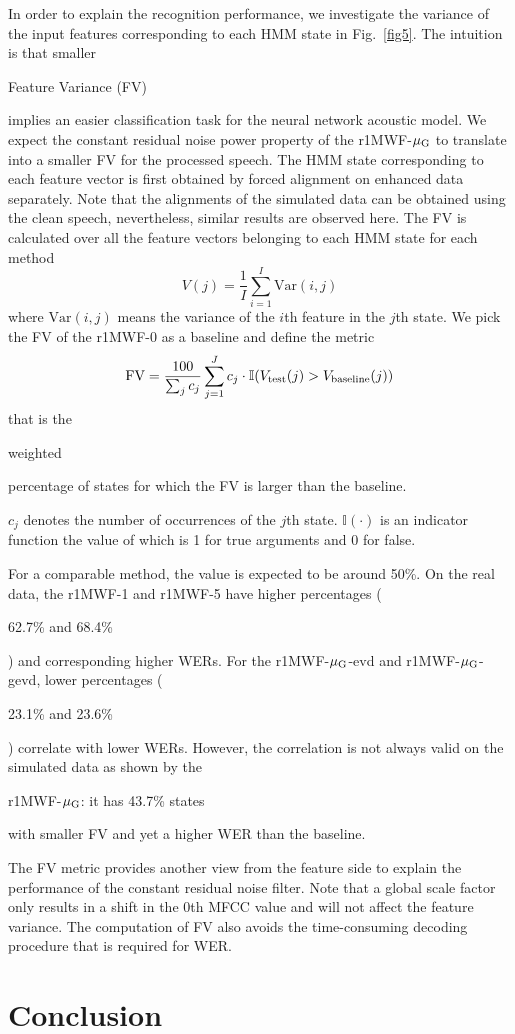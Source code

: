 \documentclass[review]{elsarticle}
\newif\ifproofread
\newcommand{\pfmarker}[1]{%
\ifproofread
\textcolor{red}{#1}%
\else
#1%
\fi
}
\newif\ifminorR
\newcommand{\pfminor}[1]{%
\ifminorR
\textcolor{red}{#1}%
\else
#1%
\fi
}
\begin{document}
In order to explain the recognition performance, we investigate the variance of the input features corresponding to each HMM state in Fig.~\ref{fig5}. The intuition is that smaller \pfminor{Feature Variance (FV)} implies an easier classification task for the neural network acoustic model. We expect the constant residual noise power property of the r1MWF-$\mu_{\text G}$ to translate into a smaller FV for the processed speech. The HMM state corresponding to each feature vector is first obtained by forced alignment on enhanced data separately. Note that the alignments of the simulated data can be obtained using the clean speech, nevertheless, similar results are observed here. The FV is calculated over all the feature vectors belonging to each HMM state for each method
\begin{equation}\label{eq:fv}
  V(j)=\frac{1}{I}\sum_{i=1}^{I}\text{Var}(i,j)
\end{equation}
where $\text{Var}(i,j)$ means the variance of the $i$th feature in the $j$th state. We pick the FV of the r1MWF-0 as a baseline and define the metric
\begin{equation}\label{eq:featvar}
  \text{FV}=\frac{100}{\sum_{j}c_j}\sum_{j=1}^{J}{\pfmarker{c_j\cdot\mathbb{I}}(V_{\text{test}}(j)>V_{\text{baseline}}(j))}
\end{equation}
that is the \pfmarker{weighted} percentage of states for which the FV is larger than the baseline. \pfmarker{$c_j$ denotes the number of occurrences of the $j$th state. $\mathbb{I}(\cdot)$ is an indicator function the value of which is 1 for true arguments and 0 for false.} For a comparable method, the value is expected to be around 50\%. On the real data, the r1MWF-1 and r1MWF-5 have higher percentages (\pfmarker{62.7\% and 68.4\%}) and corresponding higher WERs. For the r1MWF-$\mu_{\text G}$-evd and r1MWF-$\mu_{\text G}$-gevd, lower percentages (\pfmarker{23.1\% and 23.6\%}) correlate with lower WERs. However, the correlation is not always valid on the simulated data as shown by the \pfmarker{r1MWF-$\mu_{\text G}$: it has 43.7\% states} with smaller FV and yet a higher WER than the baseline.

\pfmarker{The FV metric provides another view from the feature side to explain the performance of the constant residual noise filter. Note that a global scale factor only results in a shift in the 0th MFCC value and will not affect the feature variance. The computation of FV also avoids the time-consuming decoding procedure that is required for WER.}

\section{Conclusion}
\end{document}
